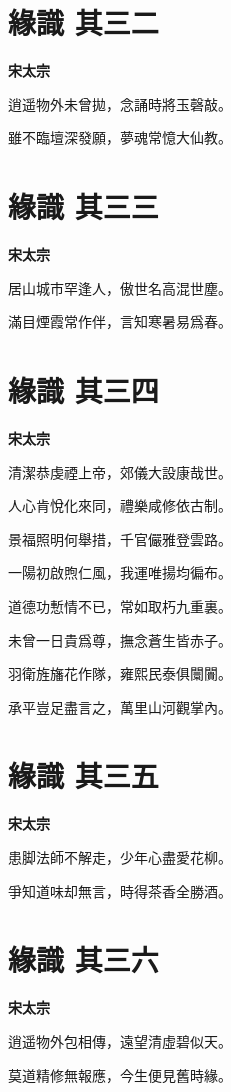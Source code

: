 \documentclass[12pt,a4paper]{ctexbook}
\begin{document}
\section{緣識  其三二}
\textbf{宋太宗}\par\vspace{0.5em}
逍遥物外未曾拋，念誦時將玉磬敲。\par
雖不臨壇深發願，夢魂常憶大仙教。\par

\section{緣識  其三三}
\textbf{宋太宗}\par\vspace{0.5em}
居山城市罕逢人，傲世名高混世塵。\par
滿目煙霞常作伴，言知寒暑易爲春。\par

\section{緣識  其三四}
\textbf{宋太宗}\par\vspace{0.5em}
清潔恭虔禋上帝，郊儀大設康哉世。\par
人心肯悅化來同，禮樂咸修依古制。\par
景福照明何舉措，千官儼雅登雲路。\par
一陽初啟煦仁風，我運唯揚均徧布。\par
道德功慙情不已，常如取朽九重裏。\par
未曾一日貴爲尊，撫念蒼生皆赤子。\par
羽衛旌旛花作隊，雍熙民泰俱闤闠。\par
承平豈足盡言之，萬里山河觀掌內。\par

\section{緣識  其三五}
\textbf{宋太宗}\par\vspace{0.5em}
患脚法師不解走，少年心盡愛花柳。\par
爭知道味却無言，時得茶香全勝酒。\par

\section{緣識  其三六}
\textbf{宋太宗}\par\vspace{0.5em}
逍遥物外包相傳，遠望清虛碧似天。\par
莫道精修無報應，今生便見舊時緣。\par
\end{document}
